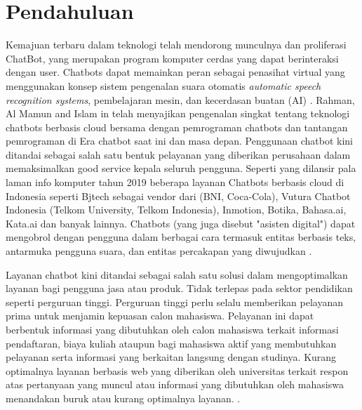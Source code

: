 \documentclass[conference]{IEEEtran}
\begin{document}
\section{Pendahuluan}
Kemajuan terbaru dalam teknologi telah mendorong munculnya dan proliferasi ChatBot, yang merupakan program komputer cerdas yang dapat berinteraksi dengan user. Chatbots dapat memainkan peran sebagai penasihat virtual yang menggunakan konsep sistem pengenalan suara otomatis \emph{automatic speech recognition systems}, pembelajaran mesin, dan kecerdasan buatan (AI) \cite{b1}. Rahman, Al Mamun and Islam in \cite{b1} telah menyajikan pengenalan singkat tentang teknologi chatbots berbasis cloud bersama dengan pemrograman chatbots dan tantangan pemrograman di Era chatbot saat ini dan masa depan. 
Penggunaan chatbot kini ditandai sebagai salah satu bentuk pelayanan yang diberikan perusahaan dalam memaksimalkan good service kepala seluruh pengguna. Seperti yang dilansir pala laman info komputer tahun 2019 beberapa layanan Chatbots berbasis cloud di Indonesia seperti Bjtech sebagai vendor dari (BNI, Coca-Cola), Vutura Chatbot Indonesia (Telkom University, Telkom Indonesia), Inmotion, Botika, Bahasa.ai, Kata.ai dan banyak lainnya. Chatbots (yang juga disebut "asisten digital") dapat mengobrol dengan pengguna dalam berbagai cara termasuk entitas berbasis teks, antarmuka pengguna suara, dan entitas percakapan yang diwujudkan \cite{b2}.

Layanan chatbot kini ditandai sebagai salah satu solusi dalam mengoptimalkan layanan bagi pengguna jasa atau produk. Tidak terlepas pada sektor pendidikan seperti perguruan tinggi. Perguruan tinggi perlu selalu memberikan pelayanan prima untuk menjamin kepuasan calon mahasiswa. Pelayanan ini dapat berbentuk informasi yang dibutuhkan oleh calon mahasiswa terkait informasi pendaftaran, biaya kuliah ataupun bagi mahasiswa aktif yang membutuhkan pelayanan serta informasi yang berkaitan langsung dengan studinya. Kurang optimalnya layanan berbasis web yang diberikan oleh universitas terkait respon atas pertanyaan yang muncul atau informasi yang dibutuhkan oleh mahasiswa menandakan buruk atau kurang optimalnya layanan. \cite{b3}.
\end{document}
